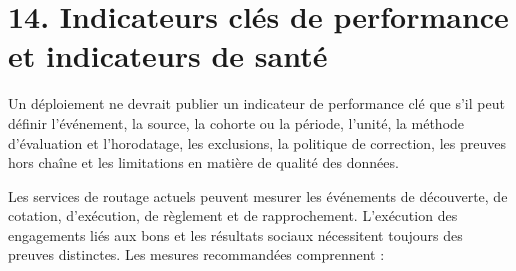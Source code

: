 \documentclass[11pt]{article}
\begin{document}
\section*{14. Indicateurs clés de performance et indicateurs de santé}

Un déploiement ne devrait publier un indicateur de performance clé que s'il peut définir l'événement, la source, la cohorte ou la période, l'unité, la méthode d'évaluation et l'horodatage, les exclusions, la politique de correction, les preuves hors chaîne et les limitations en matière de qualité des données.

Les services de routage actuels peuvent mesurer les événements de découverte, de cotation, d'exécution, de règlement et de rapprochement. L'exécution des engagements liés aux bons et les résultats sociaux nécessitent toujours des preuves distinctes. Les mesures recommandées comprennent :
\end{document}
